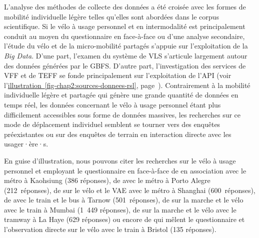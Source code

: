 \begin{refsegment}
L'analyse des méthodes de collecte des données a été croisée avec les formes de mobilité individuelle légère telles qu'elles sont abordées dans le corpus scientifique. Si le vélo à usage personnel et en intermodalité est principalement conduit au moyen du questionnaire en face-à-face ou d'une analyse secondaire, l'étude du vélo et de la micro-mobilité partagés s'appuie sur l'exploitation de la \textsl{Big Data}. D'une part, l'examen du système de \acrshort{VLS} s'articule largement autour des données générées par le \acrshort{GBFS}. D'autre part, l'investigation des services de \acrshort{VFF} et de \acrshort{TEFF} se fonde principalement sur l'exploitation de l'\acrshort{API} (voir l'\hyperref[fig-chap2:sources-donnees-rsl]{illustration~\ref{fig-chap2:sources-donnees-rsl}}, page~\pageref{fig-chap2:sources-donnees-rsl}). Contrairement à la mobilité individuelle légère et partagée qui génère une grande quantité de données en temps réel, les données concernant le vélo à usage personnel étant plus difficilement accessibles sous forme de données massives, les recherches sur ce mode de déplacement individuel semblent se tourner vers des enquêtes préexistantes ou sur des enquêtes de terrain en interaction directe avec les usager·ère·s.%

En guise d'illustration, nous pouvons citer les recherches sur le vélo à usage personnel et employant le questionnaire en face-à-face de \textcolor{blue}{\textcite[1696]{cheng_evaluating_2012}} en association avec le métro à Kaohsiung (386 réponses), de \textcolor{blue}{\textcite[41]{jansson_almeida_alternativas_2022}} avec le métro à Porto Alegre (212~réponses), de \textcolor{blue}{\textcite[183]{pan_intermodal_2010}} sur le vélo et le \acrfull{VAE} avec le métro à Shanghai (600~réponses), de \textcolor{blue}{\textcite[7]{bauer_influence_2021}} avec le train et le bus à Tarnow (501~réponses), de \textcolor{blue}{\textcite[685, 4]{rastogi_travel_2003, rastogi_willingness_2010}} sur la marche et le vélo avec le train à Mumbai (1~449 réponses), de \textcolor{blue}{\textcite[2]{rijsman_walking_2019}} sur la marche et le vélo avec le tramway à La Haye (629 réponses) ou encore de \textcolor{blue}{\textcite[192]{sherwin_practices_2011}} qui mêlent le questionnaire et l'observation directe sur le vélo avec le train à Bristol (135 réponses).%


\end{refsegment}
